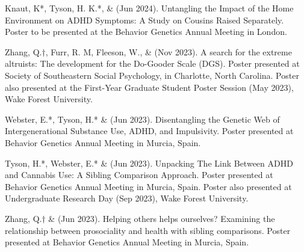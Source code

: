 \begin{etaremune}

\item Knaut, K*, Tyson, H. K.*, \& \meb (Jun 2024). Untangling the Impact of the Home Environment on ADHD Symptoms: A Study on Cousins Raised Separately. Poster to be presented at the Behavior Genetics Annual Meeting in London.

\item Zhang, Q.$\dagger$, Furr, R. M, Fleeson, W., \& \meb (Nov 2023). A search for the extreme altruists: The development for the Do-Gooder Scale (DGS). Poster presented at Society of Southeastern Social Psychology, in Charlotte, North Carolina. Poster also presented at the First-Year Graduate Student Poster Session (May 2023), Wake Forest University. %


\item Webster, E.*, Tyson, H.* \& \meb (Jun 2023). Disentangling the Genetic Web of Intergenerational Substance Use, ADHD, and Impulsivity. Poster presented at Behavior Genetics Annual Meeting in Murcia, Spain.

\item Tyson, H.*, Webster, E.*  \& \meb (Jun 2023). Unpacking The Link Between ADHD and Cannabis Use: A Sibling Comparison Approach. Poster presented at Behavior Genetics Annual Meeting in Murcia, Spain. Poster also presented at Undergraduate Research Day (Sep 2023), Wake Forest University.

\item Zhang, Q.$\dagger$ \& \meb (Jun 2023). Helping others helps ourselves? Examining the relationship between prosociality and health with sibling comparisons. Poster presented at Behavior Genetics Annual Meeting in Murcia, Spain.


\end{etaremune}
